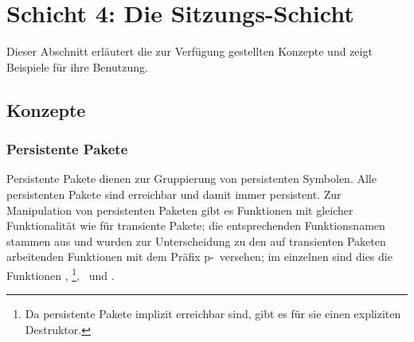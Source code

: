 \section{Schicht 4: Die Sitzungs-Schicht}
%
Dieser Abschnitt erl\"{a}utert die zur Verf\"{u}gung gestellten Konzepte und
zeigt Beispiele f\"{u}r ihre Benutzung.
%
\subsection{Konzepte}
%
\subsubsection{Persistente Pakete}
%
Persistente Pakete dienen zur Gruppierung von persistenten Symbolen.
Alle persistenten Pakete sind erreichbar und damit immer persistent.
Zur Manipulation von persistenten Paketen gibt es Funktionen mit
gleicher Funktionalit\"{a}t wie f\"{u}r transiente Pakete; die
entsprechenden Funktionsnamen stammen aus \cite{bib:st90} und wurden
zur Unterscheidung zu den auf transienten Paketen arbeitenden
Funktionen mit dem Pr\"{a}fix \rglq{}p-\rgrq\ versehen; im einzelnen sind
dies die Funktionen ,
\footnote{Da persistente Pakete implizit
erreichbar sind, gibt es f\"{u}r sie einen expliziten Destruktor.},
\ und .
%
